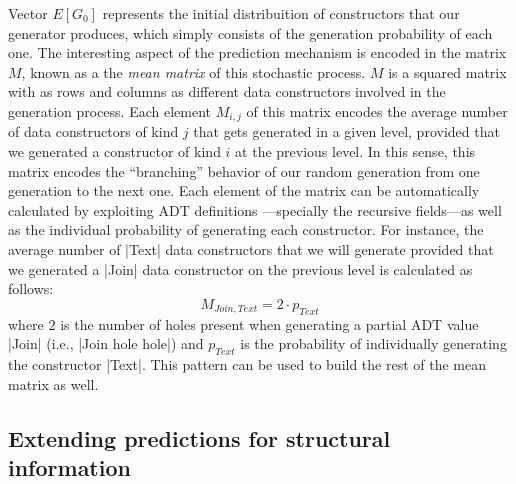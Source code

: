 Vector $E[G_0]$ represents the initial distribuition of constructors that our
generator produces, which simply consists of the generation probability of each
one.
%
The interesting aspect of the prediction mechanism is encoded in the matrix $M$,
known as a the \emph{mean matrix} of this stochastic process.
%
$M$ is a squared matrix with as rows and columns as different data constructors
involved in the generation process.
%
Each element $M_{i,j}$ of this matrix encodes the average number of data
constructors of kind $j$ that gets generated in a given level, provided that we
generated a constructor of kind $i$ at the previous level.
%
In this sense, this matrix encodes the ``branching'' behavior of our random
generation from one generation to the next one.
%
Each element of the matrix can be automatically calculated by exploiting ADT
definitions \cite{DBLP:conf/haskell/MistaRH18}---specially the recursive
fields---as well as the individual probability of generating each constructor.
%
For instance, the average number of |Text| data constructors that we will
generate provided that we generated a |Join| data constructor on the previous
level is calculated as follows:
%
$$ M_{Join, Text} = 2\cdot p_{Text} $$
%
where $2$ is the number of holes present when generating a partial ADT value
|Join| (i.e., |Join hole hole|) and $p_{Text}$ is the probability of
individually generating the constructor |Text|.
%
This pattern can be used to build the rest of the mean matrix as well.



\subsection{Extending predictions for structural information}

